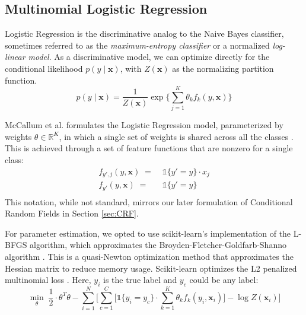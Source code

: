 \documentclass{article}
\begin{document}
\subsection{Multinomial Logistic Regression}
\label{sec:LR}
Logistic Regression is the discriminative analog to the Naive Bayes
classifier, sometimes referred to as the \textit{maximum-entropy classifier}
or a normalized \textit{log-linear model}. As a discriminative model,
we can optimize directly for the conditional likelihood $p(y \mid \mathbf{x})$,
with $Z(\mathbf{x})$ as the normalizing partition function.
\begin{equation}
  p(y \mid \mathbf{x}) = \frac{1}{Z(\mathbf{x})} \exp \Bigg\{ \sum_{j=1}^K \theta_k f_k\left( y, \mathbf{x} \right) \Bigg\}
\end{equation}

McCallum et al. formulates the Logistic Regression model, parameterized by
weights $\theta \in \mathbb{R}^K$, in which a single set of weights is shared
across all the classes \cite{McCallumCRF}. This is achieved through a set of
feature functions that are nonzero for a single class:
\begin{equation}
  \begin{aligned}
    f_{y', j} \left( y, \mathbf{x} \right) \; = \; & \mathds{1} \{ y' = y \} \cdot x_j \\
    f_{y'} \left(y, \mathbf{x}\right) \; = \; & \mathds{1} \{ y' = y \} \\
  \end{aligned}
\end{equation}
This notation, while not standard, mirrors our later formulation of Conditional
Random Fields in Section \ref{sec:CRF}.

For parameter estimation, we opted to use scikit-learn's implementation
of the L-BFGS algorithm, which approximates the Broyden-Fletcher-Goldfarb-Shanno
algorithm \cite{scikit-learn}. This is a quasi-Newton optimization method that approximates the
Hessian matrix to reduce memory usage. Scikit-learn optimizes the L2 penalized
multinomial loss \cite{scikit-learn} \cite{murphy}. Here, $y_i$ is the true
label and $y_c$ could be any label:
\begin{equation}
  \min_{\theta} \; \frac{1}{2} \cdot \theta^T \theta - \sum_{i=1}^N \Bigg[ \sum_{c=1}^C \Bigg[ \mathds{1} \{ y_i = y_c \} \cdot \sum_{k=1}^K \theta_k f_k\left( y_i, \mathbf{x}_i \right) \Bigg] - \log Z(\mathbf{x}_i)  \Bigg]
\end{equation}
\end{document}
